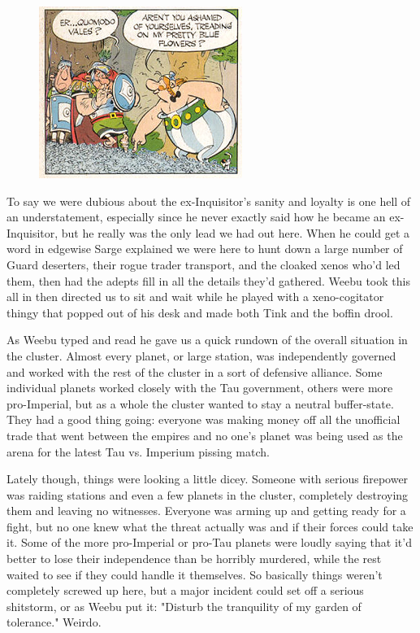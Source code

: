 \begin{figure}
	\begin{center}
		\includegraphics[width=\figwidth]{pics/10/17.png}
	\end{center}
\end{figure}
To say we were dubious about the ex-Inquisitor's sanity and loyalty is one hell of an understatement, especially since he never exactly said how he became an ex-Inquisitor, but he really was the only lead we had out here. 
When he could get a word in edgewise Sarge explained we were here to hunt down a large number of Guard deserters, their rogue trader transport, and the cloaked xenos who'd led them, then had the adepts fill in all the details they'd gathered. 
Weebu took this all in then directed us to sit and wait while he played with a xeno-cogitator thingy that popped out of his desk and made both Tink and the boffin drool.

As Weebu typed and read he gave us a quick rundown of the overall situation in the cluster. 
Almost every planet, or large station, was independently governed and worked with the rest of the cluster in a sort of defensive alliance. 
Some individual planets worked closely with the Tau government, others were more pro-Imperial, but as a whole the cluster wanted to stay a neutral buffer-state. 
They had a good thing going: 
everyone was making money off all the unofficial trade that went between the empires and no one's planet was being used as the arena for the latest Tau vs. 
Imperium pissing match.

Lately though, things were looking a little dicey. 
Someone with serious firepower was raiding stations and even a few planets in the cluster, completely destroying them and leaving no witnesses. 
Everyone was arming up and getting ready for a fight, but no one knew what the threat actually was and if their forces could take it. 
Some of the more pro-Imperial or pro-Tau planets were loudly saying that it'd better to lose their independence than be horribly murdered, while the rest waited to see if they could handle it themselves. 
So basically things weren't completely screwed up here, but a major incident could set off a serious shitstorm, or as Weebu put it: 
"Disturb the tranquility of my garden of tolerance." Weirdo.

